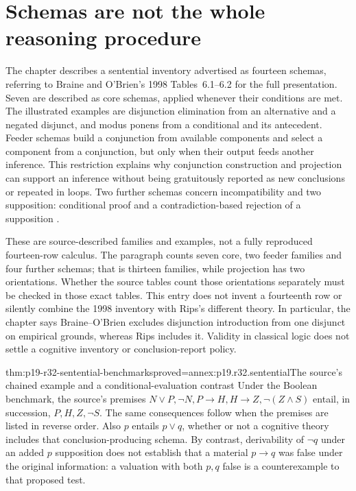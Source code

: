 \section{Schemas are not the whole reasoning procedure}
\label{sec:p19-r32-program}

The chapter describes a sentential inventory advertised as fourteen
schemas, referring to Braine and O'Brien's 1998 Tables~6.1--6.2 for the
full presentation. Seven are described as core schemas, applied whenever
their conditions are met. The illustrated examples are disjunction
elimination from an alternative and a negated disjunct, and modus ponens
from a conditional and its antecedent. Feeder schemas build a conjunction
from available components and select a component from a conjunction,
but only when their output feeds another inference. This restriction
explains why conjunction construction and projection can support an
inference without being gratuitously reported as new conclusions or
repeated in loops. Two further schemas concern incompatibility and two
supposition: conditional proof and a contradiction-based rejection of a
supposition \cite[p.~218]{OBrien2021NaturalLogic}.

These are source-described families and examples, not a fully reproduced
fourteen-row calculus. The paragraph counts seven core, two feeder
families and four further schemas; that is thirteen families, while
projection has two orientations. Whether the source tables count those
orientations separately must be checked in those exact tables. This
entry does not invent a fourteenth row or silently combine the 1998
inventory with Rips's different theory. In particular, the chapter says
Braine--O'Brien excludes disjunction introduction from one disjunct on
empirical grounds, whereas Rips includes it. Validity in classical logic
does not settle a cognitive inventory or conclusion-report policy.

\begin{hbtheorem}{thm:p19-r32-sentential-benchmarks}{proved=annex:p19.r32.sentential}{The source's chained example and a conditional-evaluation contrast}
Under the Boolean benchmark, the source's premises
\(N\lor P,\neg N,P\to H,H\to Z,\neg(Z\land S)\)
entail, in succession, \(P,H,Z,\neg S\). The same consequences follow
when the premises are listed in reverse order. Also \(p\) entails
\(p\lor q\), whether or not a cognitive theory includes that
conclusion-producing schema.
By contrast, derivability of \(\neg q\) under an added \(p\)
supposition does not establish that a material \(p\to q\) was
false under the original information: a valuation with both \(p,q\)
false is a counterexample to that proposed test.
\end{hbtheorem}

